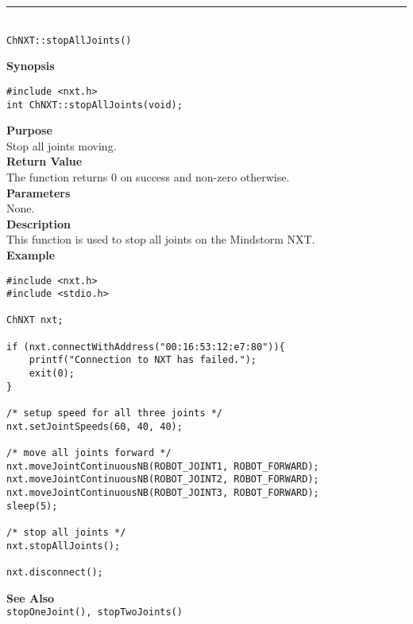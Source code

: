 \noindent
\vspace{5pt}
\rule{4.5in}{0.015in}\\
\noindent
{\LARGE \texttt{ChNXT::stopAllJoints()} }\\


\noindent
{\bf Synopsis}
\vspace{-8pt}
\begin{verbatim}
#include <nxt.h>
int ChNXT::stopAllJoints(void);
\end{verbatim}

\noindent
{\bf Purpose}\\
Stop all joints moving.\\

\noindent
{\bf Return Value}\\
The function returns 0 on success and non-zero otherwise.\\

\noindent
{\bf Parameters}\\
None.\\

\noindent
{\bf Description}\\
This function is used to stop all joints on the Mindstorm NXT.\\

\noindent
{\bf Example}
\begin{verbatim}
#include <nxt.h> 
#include <stdio.h>

ChNXT nxt;

if (nxt.connectWithAddress("00:16:53:12:e7:80")){
    printf("Connection to NXT has failed.");
    exit(0);
}
    
/* setup speed for all three joints */
nxt.setJointSpeeds(60, 40, 40);

/* move all joints forward */
nxt.moveJointContinuousNB(ROBOT_JOINT1, ROBOT_FORWARD);
nxt.moveJointContinuousNB(ROBOT_JOINT2, ROBOT_FORWARD);
nxt.moveJointContinuousNB(ROBOT_JOINT3, ROBOT_FORWARD);
sleep(5);

/* stop all joints */
nxt.stopAllJoints();

nxt.disconnect();
\end{verbatim}

\noindent
{\bf See Also}\\
\texttt{stopOneJoint(), stopTwoJoints()}\\

